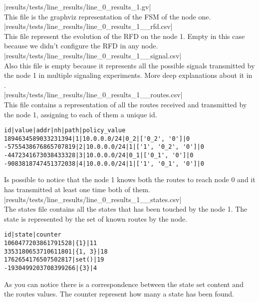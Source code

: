 \documentclass[10pt,journal,onecolumn]{IEEEtran}
\begin{document}
|results/tests/line_results/line_0_results_1.gv|\\

This file is the graphviz representation of the \ac{FSM} of the node one.\\

|results/tests/line_results/line_0_results_1__rfd.csv|\\

This file represent the evolution of the \ac{RFD} on the node 1.
Empty in this case because we didn't configure the \ac{RFD} in any node.\\

|results/tests/line_results/line_0_results_1__signal.csv|\\

Also this file is empty because it represents all the possible signals transmitted 
by the node \num{1} in multiple signaling experiments.
More deep explanations about it in .\\

|results/tests/line_results/line_0_results_1__routes.csv|\\

This file contains a representation of all the routes received and transmitted
by the node 1, assigning to each of them a unique id.
\begin{lstlisting}[language=csv]
id|value|addr|nh|path|policy_value
1894634589033231394|1|10.0.0.0/24|0_2|['0_2', '0']|0
-5755438676865707819|2|10.0.0.0/24|1|['1', '0_2', '0']|0
-4472341673038433328|3|10.0.0.0/24|0_1|['0_1', '0']|0
-9083818747451372038|4|10.0.0.0/24|1|['1', '0_1', '0']|0
\end{lstlisting}
Is possible to notice that the node \num{1} knows both the routes to reach
node \num{0} and it has transmitted at least one time both of them.\\

|results/tests/line_results/line_0_results_1__states.csv|\\

The states file contains all the states that has been touched by the node \num{1}.
The state is represented by the set of known routes by the node.
\begin{lstlisting}[language=csv]
id|state|counter
1060477203861791528|{1}|11
3353180653710611801|{1, 3}|18
1762654176507502817|set()|19
-1930499203708399266|{3}|4
\end{lstlisting}
As you can notice there is a correspondence between the state set content and the
routes values.
The counter represent how many a state has been found.\\
\end{document}
